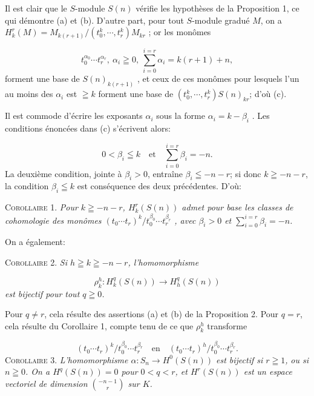 Il est clair que le $S$-module $S(n)$ vérifie les hypothèses de la Proposition 1, ce qui démontre (a) et (b). D'autre part, pour tout $S$-module gradué $M$, on a $H_k^r(M) = M_{k(r+1)}/(t_0^k , \cdots , t_r^k)M_{kr}$ ; or les monômes

\begin{equation*}
t_0^{\alpha_0} \cdots t_r^{\alpha_r} , \ \alpha_i \geqq 0, \ \sum_{i=0}^{i=r} \alpha_i = k(r + 1) + n,
\end{equation*}
forment une base de $S(n)_{k(r+1)}$ , et ceux de ces monômes pour lesquels l'un au moins des $\alpha_i$ est $\geqq k$ forment une base de $(t_0^k , \cdots , t_r^k)S(n)_{kr}$; d'où (c).

Il est commode d'écrire les exposants $\alpha_i$ sous la forme $\alpha_i = k - \beta_i$ . Les conditions énoncées dans (c) s'écrivent alors:

\begin{equation*}
0 < \beta_i \leqq k \quad \mathrm{et} \quad \sum_{i=0}^{i=r} \beta_i = -n.
\end{equation*}
La deuxième condition, jointe à $\beta_i > 0$, entraîne $\beta_i \leqq -n - r$; si donc $k \geqq -n - r$, la condition $\beta_i \leqq k$ est conséquence des deux précédentes. D'où:

\textsc{Corollaire 1.} \textit{Pour $k \geqq -n - r$, $H_k^r(S(n))$ admet pour base les classes de cohomologie des monômes $(t_0 \cdots t_r)^k/t_0^{\beta_0} \cdots t_r^{\beta_r}$ , avec $\beta_i > 0$ et $\sum_{i=0}^{i=r} \beta_i = -n$.}

On a également:

\textsc{Corollaire 2.} \textit{Si $h \geqq k \geqq -n - r$, l'homomorphisme}

\begin{equation*}
\rho_k^h : H_k^q(S(n)) \longrightarrow H_h^q(S(n))
\end{equation*}
\textit{est bijectif pour tout $q \geqq 0$.}

Pour $q \neq r$, cela résulte des assertions (a) et (b) de la Proposition 2. Pour $q = r$, cela résulte du Corollaire 1, compte tenu de ce que $\rho_k^h$ transforme

\begin{equation*}
(t_0 \cdots t_r)^k/t_0^{\beta_0} \cdots t_r^{\beta_r} \quad \mathrm{en} \quad (t_0 \cdots t_r)^h/t_0^{\beta_0} \cdots t_r^{\beta_r} .
\end{equation*}
\textsc{Corollaire 3.} \textit{L'homomorphisme $\alpha : S_n \to H^0(S(n))$ est bijectif si $r \geqq 1$,}
\textit{ou si $n \geqq 0$. On a $H^q(S(n)) = 0$ pour $0 < q < r$, et $H^r(S(n))$ est un espace vectoriel de dimension $\binom{-n-1}{r}$ sur $K$.}

